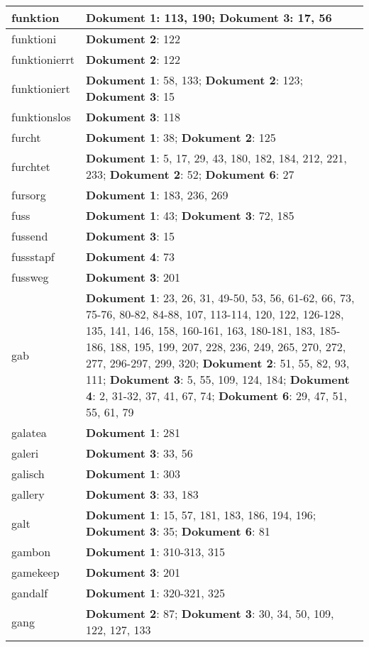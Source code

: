 \documentclass[a5paper]{article}
\begin{document}
\begin{longtable}[l]{|l|p{3in}|}
funktion & \textbf{Dokument 1}: 113, 190; \textbf{Dokument 3}: 17, 56 \\
\hline
funktioni & \textbf{Dokument 2}: 122 \\
\hline
funktionierrt & \textbf{Dokument 2}: 122 \\
\hline
funktioniert & \textbf{Dokument 1}: 58, 133; \textbf{Dokument 2}: 123; \textbf{Dokument 3}: 15 \\
\hline
funktionslos & \textbf{Dokument 3}: 118 \\
\hline
furcht & \textbf{Dokument 1}: 38; \textbf{Dokument 2}: 125 \\
\hline
furchtet & \textbf{Dokument 1}: 5, 17, 29, 43, 180, 182, 184, 212, 221, 233; \textbf{Dokument 2}: 52; \textbf{Dokument 6}: 27 \\
\hline
fursorg & \textbf{Dokument 1}: 183, 236, 269 \\
\hline
fuss & \textbf{Dokument 1}: 43; \textbf{Dokument 3}: 72, 185 \\
\hline
fussend & \textbf{Dokument 3}: 15 \\
\hline
fussstapf & \textbf{Dokument 4}: 73 \\
\hline
fussweg & \textbf{Dokument 3}: 201 \\
\hline
gab & \textbf{Dokument 1}: 23, 26, 31, 49-50, 53, 56, 61-62, 66, 73, 75-76, 80-82, 84-88, 107, 113-114, 120, 122, 126-128, 135, 141, 146, 158, 160-161, 163, 180-181, 183, 185-186, 188, 195, 199, 207, 228, 236, 249, 265, 270, 272, 277, 296-297, 299, 320; \textbf{Dokument 2}: 51, 55, 82, 93, 111; \textbf{Dokument 3}: 5, 55, 109, 124, 184; \textbf{Dokument 4}: 2, 31-32, 37, 41, 67, 74; \textbf{Dokument 6}: 29, 47, 51, 55, 61, 79 \\
\hline
galatea & \textbf{Dokument 1}: 281 \\
\hline
galeri & \textbf{Dokument 3}: 33, 56 \\
\hline
galisch & \textbf{Dokument 1}: 303 \\
\hline
gallery & \textbf{Dokument 3}: 33, 183 \\
\hline
galt & \textbf{Dokument 1}: 15, 57, 181, 183, 186, 194, 196; \textbf{Dokument 3}: 35; \textbf{Dokument 6}: 81 \\
\hline
gambon & \textbf{Dokument 1}: 310-313, 315 \\
\hline
gamekeep & \textbf{Dokument 3}: 201 \\
\hline
gandalf & \textbf{Dokument 1}: 320-321, 325 \\
\hline
gang & \textbf{Dokument 2}: 87; \textbf{Dokument 3}: 30, 34, 50, 109, 122, 127, 133 \\

\end{longtable}
\end{document}
